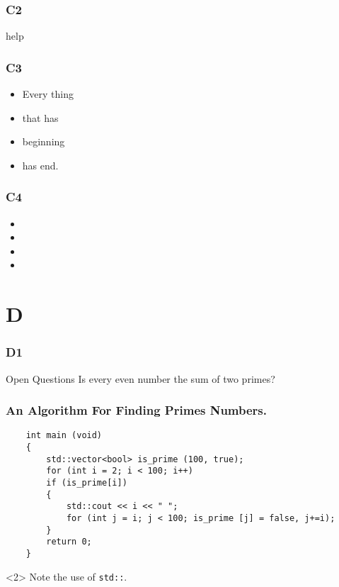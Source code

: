 \documentclass[10pt,slidestop,mathserif]{beamer}
\begin{document}
\begin{frame}
	\frametitle{C2}
	\hyperlink{th1}{}
	\hypertarget{th1}{help}
\end{frame}

\begin{frame}
	\frametitle{C3}
	\begin{itemize}
		\item <+-| alert@+> Every thing
		\item <+-| alert@+> that has
		\item <+-| alert@+> beginning
		\item <+-| alert@+> has end.
	\end{itemize}
\end{frame}

\begin{frame}
	\frametitle{C4}
	\begin{itemize}
		\item<2-> 
		\item<2-> 
		\item<2-> 
		\item<2-> 
	\end{itemize}

\end{frame}

%

\section{D}
\begin{frame}
	\frametitle{D1}
	\begin{block}{Open Questions}
		Is every even number the sum of two primes?
		\cite{Goldbach1742}
	\end{block}

\end{frame}

\begin{frame}[fragile]
	\frametitle{An Algorithm For Finding Primes Numbers.}
	\begin{verbatim}
	int main (void)
	{
		std::vector<bool> is_prime (100, true);
		for (int i = 2; i < 100; i++)
		if (is_prime[i])
		{
			std::cout << i << " ";
			for (int j = i; j < 100; is_prime [j] = false, j+=i);
		}
		return 0;
	}
	\end{verbatim}
	\begin{uncoverenv}
		Note the use of \verb|std::|.
	\end{uncoverenv}
\end{frame}
\end{document}

